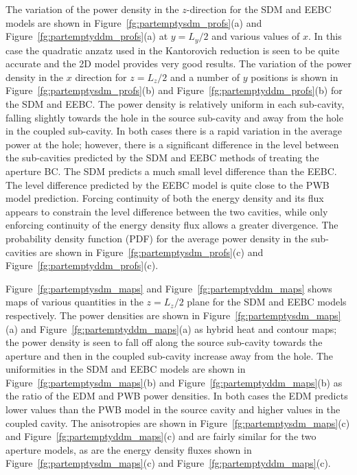 \documentclass[a4paper]{article}
\numberwithin{equation}{section}
\newcounter{Figure}
\begin{document}
The variation of the power density in the $z$-direction for the SDM and EEBC models are shown in 
Figure~\ref{fg:partemptysdm_profs}(a) and Figure~\ref{fg:partemptyddm_profs}(a) at $y=L_y/2$ and various 
values of $x$. In this case the quadratic anzatz used in the Kantorovich reduction
is seen to be quite accurate and the 2D model provides very good results. The variation of the power density 
in the $x$ direction for $z=L_z/2$ and a number of $y$ positions is shown in Figure~\ref{fg:partemptysdm_profs}(b)
and Figure~\ref{fg:partemptyddm_profs}(b) for the SDM and EEBC. The power density is relatively uniform in each
sub-cavity, falling slightly towards the hole in the source sub-cavity and away from the hole in the coupled 
sub-cavity. In both cases there is a rapid variation in the average power at the hole; however, there is a 
significant difference in the level between the sub-cavities predicted by the SDM and EEBC methods 
of treating the aperture BC. The SDM predicts a much small level difference than the EEBC. The level difference
predicted by the EEBC model is quite close to the PWB model prediction. Forcing continuity of both the energy
density and its flux appears to constrain the level difference between the two cavities, while only enforcing
continuity of the energy density flux allows a greater divergence. The probability density function (PDF)
for the average power density in the sub-cavities are shown in Figure~\ref{fg:partemptysdm_profs}(c) and
Figure~\ref{fg:partemptyddm_profs}(c).

Figure~\ref{fg:partemptysdm_maps} and Figure~\ref{fg:partemptyddm_maps} shows maps of various quantities in 
the $z=L_z/2$ plane for the SDM and EEBC models respectively. The power densities are shown in 
Figure~\ref{fg:partemptysdm_maps}(a) and Figure~\ref{fg:partemptyddm_maps}(a) as hybrid heat and contour maps; 
the power density is seen to fall off along the source sub-cavity towards the aperture and then in the coupled
sub-cavity increase away from the hole. The uniformities in the SDM and EEBC models are shown in 
Figure~\ref{fg:partemptysdm_maps}(b) and Figure~\ref{fg:partemptyddm_maps}(b) as the ratio of the EDM and 
PWB power densities. In both cases the EDM predicts lower values than the PWB model in the source cavity and
higher values in the coupled cavity. The anisotropies are shown in Figure~\ref{fg:partemptysdm_maps}(c) and
Figure~\ref{fg:partemptyddm_maps}(c) and are fairly similar for the two aperture models, as are the energy
density fluxes shown in Figure~\ref{fg:partemptysdm_maps}(c) and Figure~\ref{fg:partemptyddm_maps}(c).
\end{document}
